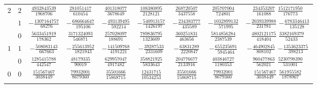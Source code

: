 \begin{table}
\begin{center}
\begin{tabular}{ccccccccc}
      $2$  &  $2$  &  $ \frac{ 4932843539}{1968706}$  &  $ \frac{  281051417}{  610454}$  &  $ \frac{ 401318077}{ 3678649}$  &  $ \frac{ 108380895}{ 2128121}$  &  $ \frac{ 268720507}{ 3437558}$  &  $ \frac{ 205707004}{  724801} $  &  $ \frac{  234353207}{  161088}$  $ \frac{ 1512171950}{ 176773}$  \\ \addlinespace
           &  $1$  &  $-\frac{ 1307164757}{  68276}$  &  $-\frac{  686664647}{  195106}$  &  $-\frac{ 493139495}{  592214}$  &  $-\frac{ 540913157}{ 1426197}$  &  $-\frac{ 234383777}{  435589}$  &  $-\frac{1032899132}{  571995} $  &  $-\frac{ 2039339988}{  231781}$  $-\frac{ 6783346413}{ 135128}$  \\ \addlinespace
           &  $0$  &  $ \frac{ 5633451919}{ 178362}$  &  $ \frac{ 3171324093}{  546871}$  &  $ \frac{ 257028097}{  188691}$  &  $ \frac{ 789836795}{ 1323609}$  &  $ \frac{ 360251831}{  463656}$  &  $ \frac{5814856284}{ 2387539} $  &  $ \frac{ 4802121175}{  418404}$  $ \frac{ 3382169379}{  52433}$  \\ \addlinespace
      $1$  &  $1$  &  $-\frac{  508083143}{ 667663}$  &  $-\frac{  255613952}{ 1821943}$  &  $-\frac{ 141509768}{ 4191221}$  &  $-\frac{  39287533}{ 2331609}$  &  $-\frac{  63831289}{ 2220847}$  &  $-\frac{ 655235691}{ 5945464} $  &  $-\frac{  464902845}{  808102}$  $-\frac{ 1353623375}{ 398213}$  \\ \addlinespace
           &  $0$  &  $ \frac{ 1285415788}{ 442547}$  &  $ \frac{   48179335}{   90019}$  &  $ \frac{ 629957047}{ 4917482}$  &  $ \frac{ 358821925}{ 5833643}$  &  $ \frac{ 204776677}{ 2133916}$  &  $ \frac{ 403846727}{ 1180353} $  &  $ \frac{  960477863}{  562021}$  $ \frac{ 5230798390}{ 531001}$  \\ \addlinespace
      $0$  &  $0$  &  $ \frac{  151567467}{3038449}$  &  $ \frac{   79932001}{ 8679360}$  &  $ \frac{  35501666}{15868715}$  &  $ \frac{  12431715}{10534253}$  &  $ \frac{  35501666}{15868715}$  &  $ \frac{  79932001}{ 8679360} $  &  $ \frac{  151567467}{ 3038449}$  $ \frac{  561955582}{1878967}$  \\ \addlinespace
      \bottomrule
    \end{tabular}
  \end{center}
\end{table}


